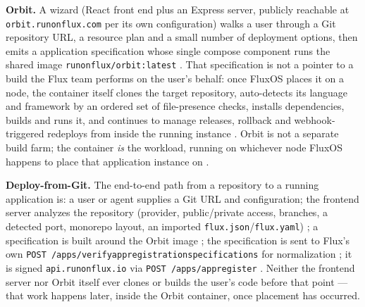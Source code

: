 \textbf{Orbit.} A wizard (React front end plus an Express server, publicly reachable at
\texttt{orbit.\allowbreak{}runonflux.\allowbreak{}com} per its own configuration) walks a user through a Git
repository URL, a resource plan and a small number of deployment options, then emits a
 application specification whose single compose component runs the shared image
\texttt{runonflux/\allowbreak{}orbit:latest} \shipped
{}
.
That specification is not a pointer to a build the Flux team performs on the user's
behalf: once FluxOS places it on a node, the container itself clones the target
repository, auto-detects its language and framework by an ordered set of file-presence
checks, installs dependencies, builds and runs it, and continues to manage releases,
rollback and webhook-triggered redeploys from inside the running instance \shipped
{} 
. Orbit is not a separate build farm; the
container \emph{is} the workload, running on whichever node FluxOS happens to place that
application instance on \shipped {}
.

\textbf{Deploy-from-Git.} The end-to-end path from a repository to a running application
is: a user or agent supplies a Git URL and configuration; the frontend server analyzes
the repository (provider, public/private access, branches, a detected port, monorepo
layout, an imported \texttt{flux.json}\slash\texttt{flux.yaml}) \shipped
{}; a 
specification is built around the Orbit image \shipped
{}; the
specification is sent to Flux's own \texttt{POST /\allowbreak{}apps/\allowbreak{}verifyap\allowbreak{}pregistr\allowbreak{}ationspe\allowbreak{}cificati\allowbreak{}ons}
for normalization \shipped
{}; it is signed
\texttt{api.\allowbreak{}runonflux.\allowbreak{}io} via \texttt{POST /\allowbreak{}apps/\allowbreak{}appregister} \shipped
{}. Neither the
frontend server nor Orbit itself ever clones or builds the user's code before that point
— that work happens later, inside the Orbit container, once placement has occurred.

